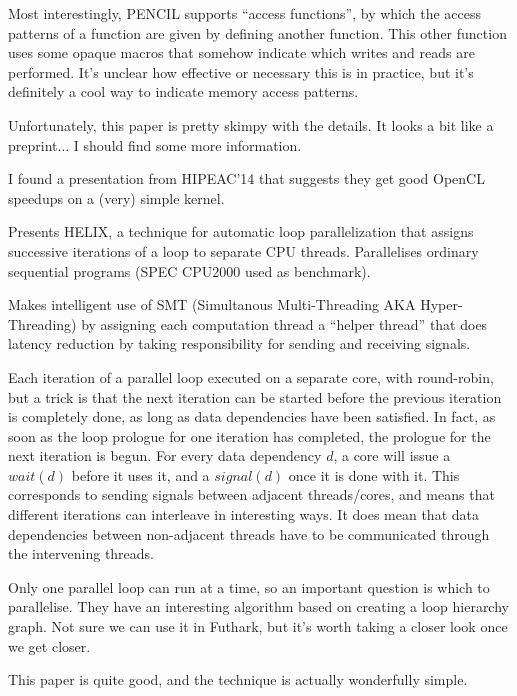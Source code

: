 \documentclass[a4paper, oneside, final]{memoir}
\begin{document}
Most interestingly, PENCIL supports ``access functions'', by which the
access patterns of a function are given by defining another function.
This other function uses some opaque macros that somehow indicate
which writes and reads are performed.  It's unclear how effective or
necessary this is in practice, but it's definitely a cool way to
indicate memory access patterns.

Unfortunately, this paper is pretty skimpy with the details.  It looks
a bit like a preprint... I should find some more information.

I found a presentation from HIPEAC'14 that suggests they get good
OpenCL speedups on a (very) simple kernel.

\begin{quote}
\end{quote}

Presents HELIX, a technique for automatic loop parallelization that
assigns successive iterations of a loop to separate CPU threads.
Parallelises ordinary sequential programs (SPEC CPU2000 used as
benchmark).

Makes intelligent use of SMT (Simultanous Multi-Threading AKA
Hyper-Threading) by assigning each computation thread a ``helper
thread'' that does latency reduction by taking responsibility for
sending and receiving signals.

Each iteration of a parallel loop executed on a separate core, with
round-robin, but a trick is that the next iteration can be started
before the previous iteration is completely done, as long as data
dependencies have been satisfied.  In fact, as soon as the loop
prologue for one iteration has completed, the prologue for the next
iteration is begun.  For every data dependency $d$, a core will issue
a $wait(d)$ before it uses it, and a $signal(d)$ once it is done with
it.  This corresponds to sending signals between adjacent
threads/cores, and means that different iterations can interleave in
interesting ways.  It does mean that data dependencies between
non-adjacent threads have to be communicated through the intervening
threads.

Only one parallel loop can run at a time, so an important question is
which to parallelise.  They have an interesting algorithm based on
creating a loop hierarchy graph.  Not sure we can use it in Futhark,
but it's worth taking a closer look once we get closer.

This paper is quite good, and the technique is actually wonderfully
simple.
\end{document}
